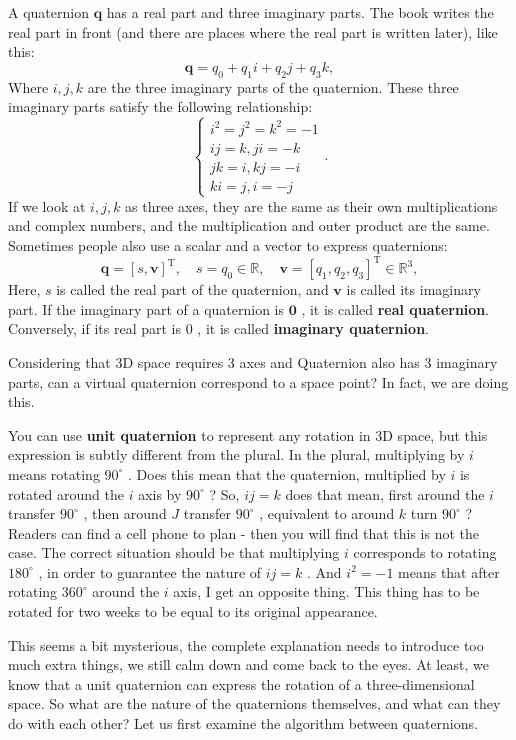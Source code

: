 A quaternion $ \bm{q} $ has a real part and three imaginary parts. The book writes the real part in front (and there are places where the real part is written later), like this:
\begin{equation}
 \bm{q} = q_0 + q_1 i + q_2 j + q_3 k,
\end{equation}
Where $ i,j,k $ are the three imaginary parts of the quaternion. These three imaginary parts satisfy the following relationship:
\begin{equation}
\label{eq:quaternionVirtual}
\left\{ \begin{array}{l}
{i^2} = {j^2} = {k^2} =  - 1\\
ij = k, ji = - k \\
jk = i,kj =  - i\\
ki = j, i = - j
\end{array} \right. .
\end{equation}
If we look at $ i, j, k $ as three axes, they are the same as their own multiplications and complex numbers, and the multiplication and outer product are the same. Sometimes people also use a scalar and a vector to express quaternions:
\[
 \bm{q} = \left[ s, \bm{v} \right]^\mathrm{T}, \quad s=q_0 \in \mathbb{R},\quad \bm{v} = [q_1, q_2, q_3]^\mathrm{T} \in \mathbb{R}^3,
\]
Here, $ s $ is called the real part of the quaternion, and $ \bm {v} $ is called its imaginary part. If the imaginary part of a quaternion is $ \bm {0} $ , it is called \textbf{real quaternion}. Conversely, if its real part is $ 0 $ , it is called \textbf{imaginary quaternion}.

 Considering that 3D space requires 3 axes and Quaternion also has 3 imaginary parts, can a virtual quaternion correspond to a space point? In fact, we are doing this.

You can use \textbf{unit quaternion} to represent any rotation in 3D space, but this expression is subtly different from the plural. In the plural, multiplying by $ i $ means rotating $ 90 ^ \circ $ . Does this mean that the quaternion, multiplied by $ i $ is rotated around the $ i $ axis by $ 90 ^ \circ $ ? So, $ ij = k $ does that mean, first around the $ i $ transfer $ 90 ^ \circ $ , then around $ J $ transfer $ 90 ^ \circ $ , equivalent to around $ k$ turn $ 90 ^ \circ $ ? Readers can find a cell phone to plan - then you will find that this is not the case. The correct situation should be that multiplying $ i $ corresponds to rotating $ 180 ^ \circ $ , in order to guarantee the nature of $ ij=k $ . And $ i^ 2 =- 1 $ means that after rotating $ 360 ^ \circ $ around the $ i $ axis, I get an opposite thing. This thing has to be rotated for two weeks to be equal to its original appearance.

This seems a bit mysterious, the complete explanation needs to introduce too much extra things, we still calm down and come back to the eyes. At least, we know that a unit quaternion can express the rotation of a three-dimensional space. So what are the nature of the quaternions themselves, and what can they do with each other? Let us first examine the algorithm between quaternions.
